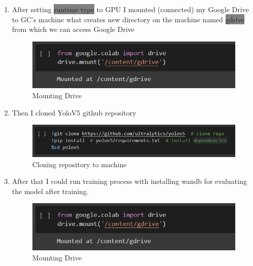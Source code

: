 \begin{enumerate}
    \item After setting \colorbox{Gray}{runtime type} to GPU I mounted (connected) my Google Drive to GC's machine what creates new directory on the machine named \colorbox{Gray}{gdrive} from which we can access Google Drive
    \newline \begin{figure} [h]
        \centering
        \includegraphics{images/train1}
        \caption{Mounting Drive}
        \label{fig:train1}
    \end{figure}
    \item Then I cloned YoloV5 github repository
    \newline \begin{figure} [h]
        \centering
        \includegraphics{images/train2}
        \caption{Cloning repository to machine}
        \label{fig:train2}
    \end{figure}
    \item After that I could run training process with installing wandb for evaluating the model after training.
    \newline \begin{figure} [h]
        \centering
        \includegraphics{images/train1}
        \caption{Mounting Drive}
        \label{fig:train1}
    \end{figure}
    
\end{enumerate}